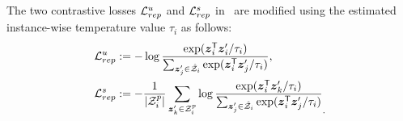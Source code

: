 The two contrastive losses $\mathcal{L}^u_{rep}$ and $\mathcal{L}^s_{rep}$ in~ are modified using the estimated instance-wise temperature value $\tau_i$ as follows:
\begin{equation}
\begin{split}
& \mathcal{L}^u_{rep}:= -\log \frac{\exp(\boldsymbol{z}_i^\mathsf{T} \boldsymbol{z}'_i/\tau_i)}{\sum_{\boldsymbol{z}'_j \in \hat{\mathcal{Z}}_i } \exp(\boldsymbol{z}_i^\mathsf{T} \boldsymbol{z}'_j/\tau_i)}, \\
& \mathcal{L}^s_{rep} := - \frac{1}{|\mathcal{Z}^p_i|}\sum_{\boldsymbol{z}'_k \in \mathcal{Z}^p_i} \log \frac{\exp(\boldsymbol{z}_i^\mathsf{T} \boldsymbol{z}'_k/\tau_i)}{\sum_{\boldsymbol{z}'_j \in \hat{\mathcal{Z}}_i } \exp(\boldsymbol{z}_i^\mathsf{T} \boldsymbol{z}'_j/\tau_i)}_.
\label{eqn:loss_unsupervised}
\end{split}
\end{equation}










